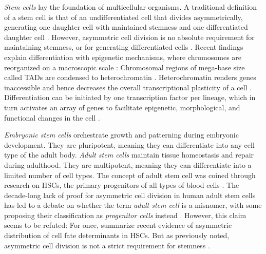 \emph{Stem cells} lay the foundation of multicellular organisms. A traditional
definition of a stem cell is that of an undifferentiated cell that divides
asymmetrically, generating one daughter cell with maintained stemness and one
differentiated daughter cell \cite{cooperCellProliferationDevelopment2000,
    shenghuiMechanismsStemCell2009}. However, asymmetric cell division is no
absolute requirement for maintaining stemness, or for generating differentiated cells
\cite{morrisonStemCellsNiches2008, yamashitaPolarityStemCell2010,
    shahriyariSymmetricVsAsymmetric2013, nakamuraAsymmetricitySisterCells2018}.
Recent findings explain differentiation with epigenetic mechanisms, where
chromosomes are reorganized on a macroscopic scale
\cite{dixonChromatinArchitectureReorganization2015}: Chromosomal regions of
mega-base size called \acp{TAD}  are condensed to heterochromatin
\cite{ciabrelliChromatinDrivenBehaviorTopologically2015}. Heterochromatin
renders genes inaccessible and hence decreases the overall transcriptional
plasticity of a cell \cite{stanchevaRevisitingHeterochromatinEmbryonic2011,
    xieEpigenomicAnalysisMultilineage2013, chenSpatialGenomeReorganization2019}.
Differentiation can be initiated by one transcription factor per lineage, which
in turn activates an array of genes to facilitate epigenetic, morphological, and
functional changes in the cell \cite{almalkiKeyTranscriptionFactors2016,
    walewskaMesenchymalStemCells2023}.

\emph{Embryonic stem cells} orchestrate growth and patterning during embryonic
development. They are pluripotent, meaning they can differentiate into any cell
type of the adult body. \emph{Adult stem cells}  maintain tissue homeostasis and repair during
adulthood. They are multipotent, meaning they can differentiate into a limited
number of cell types. The concept of adult stem cell was coined through research
on \acp{HSC}, the primary progenitors of all types of blood cells
\cite{leeHematopoieticStemCells2019, nunesAsymmetricCellDivision2024}. The
decade-long lack of proof for asymmetric cell division in human adult stem cells
has led to a debate on whether the term \emph{adult stem cell} is a misnomer,
with some proposing their classification as \emph{progenitor cells} instead
\cite{bhartiyaStemCellsProgenitors2015}. However, this claim seems to be
refuted: For once, \citet{nunesAsymmetricCellDivision2024} summarize recent
evidence of asymmetric distribution of cell fate determinants in \acp{HSC}. But
as previously noted, asymmetric cell division is not a strict requirement for
stemness \cite{shahriyariSymmetricVsAsymmetric2013}.

